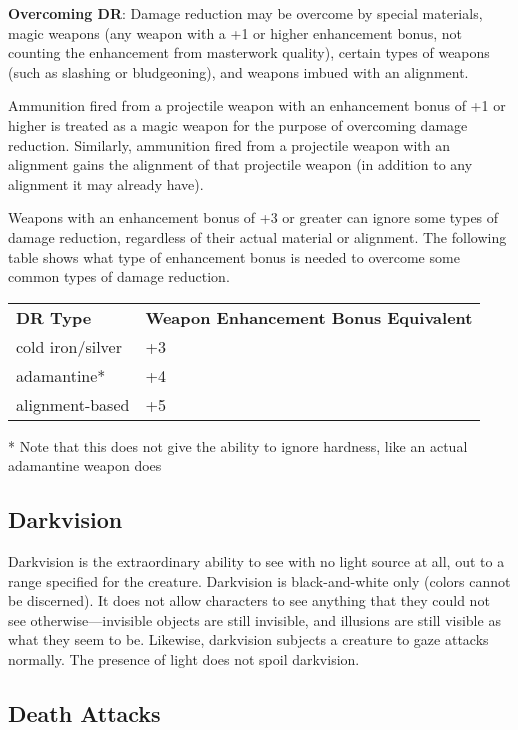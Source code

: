 \textbf{Overcoming DR}: Damage reduction may be overcome by special materials, magic weapons (any weapon with a +1 or higher enhancement bonus, not counting the enhancement from masterwork quality), certain types of weapons (such as slashing or bludgeoning), and weapons imbued with an alignment. 
				
Ammunition fired from a projectile weapon with an enhancement bonus of +1 or higher is treated as a magic weapon for the purpose of overcoming damage reduction. Similarly, ammunition fired from a projectile weapon with an alignment gains the alignment of that projectile weapon (in addition to any alignment it may already have).
				
Weapons with an enhancement bonus of +3 or greater can ignore some types of damage reduction, regardless of their actual material or alignment. The following table shows what type of enhancement bonus is needed to overcome some common types of damage reduction.

\begin{tabular}{ll}
\textbf{DR Type} & \textbf{Weapon Enhancement Bonus Equivalent} \\
cold iron/silver & +3\\
adamantine* & +4 \\
alignment-based & +5\\
\end{tabular}
* Note that this does not give the ability to ignore hardness, like an actual adamantine weapon does

				
\subsection{Darkvision}

				
Darkvision is the extraordinary ability to see with no light source at all, out to a range specified for the creature. Darkvision is black-and-white only (colors cannot be discerned). It does not allow characters to see anything that they could not see otherwise---invisible objects are still invisible, and illusions are still visible as what they seem to be. Likewise, darkvision subjects a creature to gaze attacks normally. The presence of light does not spoil darkvision.
				
\subsection{Death Attacks}

